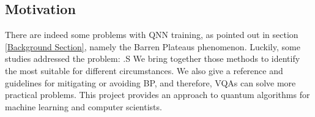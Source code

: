 \subsection{Motivation}
There are indeed some problems with QNN training, as pointed out in section \ref{Background Section}, namely the Barren Plateaus phenomenon.
Luckily, some studies addressed the problem: \cite{pesahAbsenceBarrenPlateaus2021,pattiEntanglementDevisedBarren2021,liuParameterInitializationMethod2021}.S
We bring together those methods to identify the most suitable for different circumstances.
We also give a reference and guidelines for mitigating or avoiding BP, and therefore, VQAs can solve more practical problems. 
This project provides an approach to quantum algorithms for machine learning and computer scientists.